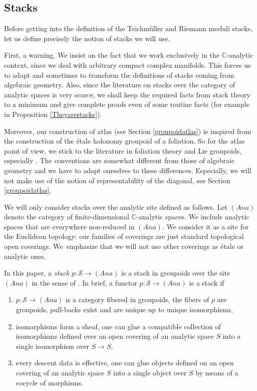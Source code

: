 \documentclass[10pt]{amsart}
\let\mathcal\mathscr
\newcommand{\Ana}{\mathit{Ana}}
\theoremstyle{plain}
\theoremstyle{definition}
\theoremstyle{remark}
\numberwithin{equation}{section}
\newcommand{\CC}{{\mathbb{C}}}
\begin{document}
\subsection{Stacks}
\label{stacksgroupoids}
Before getting into the definition of the Teichmüller and Riemann moduli stacks, let us define precisely the notion of stacks we will use.

First, a warning. We insist on the fact that we work exclusively in the $\CC$-analytic context, since we deal with arbitrary compact complex
manifolds. This forces us to adapt and sometimes to transform the definitions of stacks coming from algebraic geometry. Also, since the literature on stacks over the category of analytic spaces is very scarce, we shall keep the required facts from stack theory to a minimum and give complete proofs even of some routine facts (for example in Proposition \ref{Theyarestacks}).

Moreover, our construction of atlas (see Section \ref{groupoidatlas}) is inspired from the construction of the étale holonomy groupoid of a foliation. So for the atlas point of view, we stick to the literature in foliation theory and Lie groupoids, especially \cite{Moerdijk}. The conventions are somewhat different from those of algebraic geometry and we have to adapt ourselves to these differences. Especially, we will not make use of the notion of representability of the diagonal, see Section \ref{groupoidatlas}.

We will only consider stacks over the analytic site defined as follows. Let $(\Ana)$ \hbox{denote} the category of finite-dimensional $\CC$-analytic spaces. We include analytic spaces that are everywhere non-reduced in $(\Ana)$. We consider it as a site for the \hbox{Euclidean} topology: our families of coverings are just standard topological open coverings. We~emphasize that we will not use other coverings as étale or analytic ones.

In this paper, a \emph{stack} $p:\mathcal S\to (\Ana)$ is a stack in groupoids over the site $(\Ana)$ in the sense of \cite[Def.\,8.5.1]{Stacksproject}.
In brief, a functor $p:\mathcal S\to (\Ana)$ is a stack if
\begin{enumerate}
\item
$p:\mathcal S\to(\Ana)$ is a category fibered in groupoids, \ie the fibers of $p$ are groupoids, pull-backs exist and are unique up to unique isomorphisms,
\item
isomorphisms form a sheaf, \ie one can glue a compatible collection of isomorphisms defined over an open covering of an analytic space $S$ into a single isomorphism over $S\to S$,
\item
every descent data is effective, \ie one can glue objects defined on an open covering of an analytic space $S$ into a single object over $S$ by means of a cocycle of morphisms.
\end{enumerate}
\end{document}
